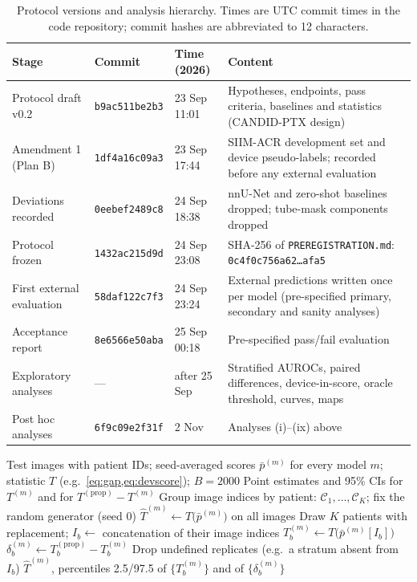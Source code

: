 \documentclass{ieeeaccess}
\begin{document}
\begin{table}[!t]
\centering\small
\caption{Protocol versions and analysis hierarchy. Times are UTC commit times in the code repository; commit hashes are abbreviated to 12 characters.}
\label{tab:protocol}
\begin{tabularx}{\linewidth}{@{}p{3.6cm} l l X@{}}
\toprule
Stage & Commit & Time (2026) & Content \\
\midrule
Protocol draft v0.2 & \texttt{b9ac511be2b3} & 23 Sep 11:01 & Hypotheses, endpoints, pass criteria, baselines and statistics (CANDID-PTX design) \\
Amendment 1 (Plan B) & \texttt{1df4a16c09a3} & 23 Sep 17:44 & SIIM-ACR development set and device pseudo-labels; recorded before any external evaluation \\
Deviations recorded & \texttt{0eebef2489c8} & 24 Sep 18:38 & nnU-Net and zero-shot baselines dropped; tube-mask components dropped \\
Protocol frozen & \texttt{1432ac215d9d} & 24 Sep 23:08 & SHA-256 of \texttt{PREREGISTRATION.md}: \texttt{0c4f0c756a62\ldots afa5} \\
First external evaluation & \texttt{58daf122c7f3} & 24 Sep 23:24 & External predictions written once per model (pre-specified primary, secondary and sanity analyses) \\
Acceptance report & \texttt{8e6566e50aba} & 25 Sep 00:18 & Pre-specified pass/fail evaluation \\
Exploratory analyses & --- & after 25 Sep & Stratified AUROCs, paired differences, device-in-score, oracle threshold, curves, maps \\
Post hoc analyses & \texttt{6f9c09e2f31f} & 2 Nov & Analyses (i)--(ix) above \\
\bottomrule
\end{tabularx}
\end{table}

\begin{algorithm}[!t]
\caption{Patient-cluster bootstrap for CIs and paired differences}
\label{alg:boot}
\begin{algorithmic}[1]
\Require Test images with patient IDs; seed-averaged scores $\bar p^{(m)}$ for every model $m$; statistic $T$ (e.g.\ \cref{eq:gap,eq:devscore}); $B=2000$
\Ensure Point estimates and 95\% CIs for $T^{(m)}$ and for $T^{(\text{prop})}-T^{(m)}$
\State Group image indices by patient: $\mathcal{C}_1,\dots,\mathcal{C}_K$; fix the random generator (seed 0)
\State $\hat T^{(m)}\gets T\big(\bar p^{(m)}\big)$ on all images
  \State Draw $K$ patients with replacement; $I_b\gets$ concatenation of their image indices
   \State $T^{(m)}_b\gets T\big(\bar p^{(m)}[I_b]\big)$ 
  \EndFor
  \State $\delta^{(m)}_b\gets T^{(\text{prop})}_b-T^{(m)}_b$
\EndFor
\State Drop undefined replicates (e.g.\ a stratum absent from $I_b$)
\State \Return $\hat T^{(m)}$, percentiles 2.5/97.5 of $\{T^{(m)}_b\}$ and of $\{\delta^{(m)}_b\}$
\end{algorithmic}
\end{algorithm}
\end{document}
